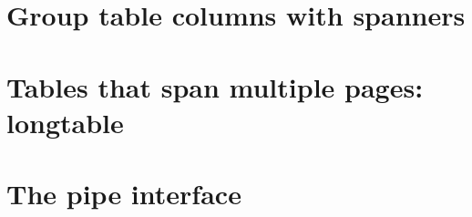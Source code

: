 \documentclass[
]{book}
\begin{document}
\hypertarget{group-table-columns-with-spanners}{%
\chapter{Group table columns with spanners}\label{group-table-columns-with-spanners}}

\hypertarget{tables-that-span-multiple-pages-longtable}{%
\chapter{Tables that span multiple pages: longtable}\label{tables-that-span-multiple-pages-longtable}}

\hypertarget{the-pipe-interface}{%
\chapter{The pipe interface}\label{the-pipe-interface}}

  
\end{document}
